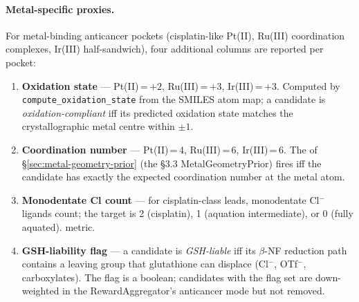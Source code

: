 \paragraph{Metal-specific proxies.}
For metal-binding anticancer pockets (cisplatin-like Pt(II),
Ru(III) coordination complexes, Ir(III) half-sandwich), four
additional columns are reported per pocket:
\begin{enumerate}
  \item \textbf{Oxidation state} --- Pt(II)\,=\,$+2$,
        Ru(III)\,=\,$+3$, Ir(III)\,=\,$+3$. Computed by
        \texttt{compute\_oxidation\_state} from the SMILES atom map;
        a candidate is \emph{oxidation-compliant} iff its predicted
        oxidation state matches the crystallographic metal centre
        within $\pm 1$.
  \item \textbf{Coordination number} --- Pt(II)\,=\,4,
        Ru(III)\,=\,6, Ir(III)\,=\,6. The \mgp{} of
        \S\ref{sec:metal-geometry-prior} (the §3.3
        MetalGeometryPrior) fires iff the candidate has exactly
        the expected coordination number at the metal atom.
  \item \textbf{Monodentate Cl count} --- for cisplatin-class
        leads, monodentate Cl$^{-}$ ligands count; the target is
        2 (cisplatin), 1 (aquation intermediate), or 0 (fully
        aquated). \DESIGN{} metric.
  \item \textbf{GSH-liability flag} --- a candidate is
        \emph{GSH-liable} iff its $\beta$-NF reduction path
        contains a leaving group that glutathione can displace
        (Cl$^{-}$, OTf$^{-}$, carboxylates). The flag is a boolean;
        candidates with the flag set are down-weighted in the
        RewardAggregator's anticancer mode but not removed.
\end{enumerate}

